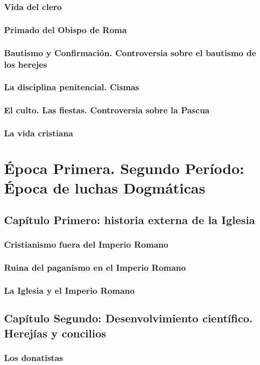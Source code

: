 \raggedbottom{} \documentclass[12pt]{book}
\begin{document}
\section{Vida del clero}
\section{Primado del Obispo de Roma}
\section{Bautismo y Confirmación. Controversia sobre el bautismo de los herejes}
\section{La disciplina penitencial. Cismas}
\section{El culto. Las fiestas. Controversia sobre la Pascua}
\section{La vida cristiana}
\part{Época Primera. Segundo Período: Época de luchas Dogmáticas}
\chapter{Capítulo Primero: historia externa de la Iglesia}
\section{Cristianismo fuera del Imperio Romano}
\section{Ruina del paganismo en el Imperio Romano}
\section{La Iglesia y el Imperio Romano}
\chapter{Capítulo Segundo: Desenvolvimiento científico. Herejías y concilios}
\section{Los donatistas}
\end{document}
